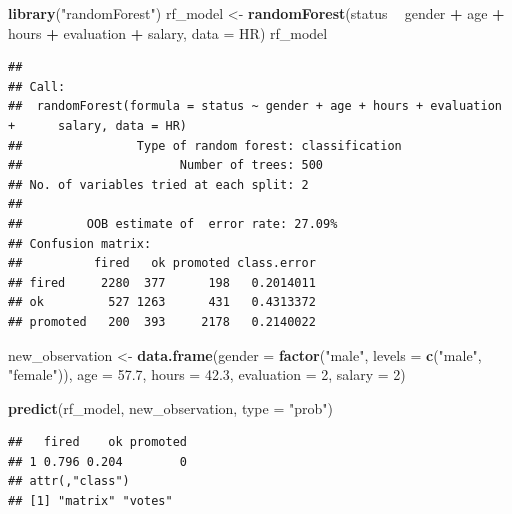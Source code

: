 \documentclass[]{krantz}
\newenvironment{Shaded}{\begin{snugshade}}{\end{snugshade}}
\newcommand{\DataTypeTok}[1]{\textcolor[rgb]{0.13,0.29,0.53}{#1}}
\newcommand{\DecValTok}[1]{\textcolor[rgb]{0.00,0.00,0.81}{#1}}
\newcommand{\FloatTok}[1]{\textcolor[rgb]{0.00,0.00,0.81}{#1}}
\newcommand{\KeywordTok}[1]{\textcolor[rgb]{0.13,0.29,0.53}{\textbf{#1}}}
\newcommand{\NormalTok}[1]{#1}
\newcommand{\OperatorTok}[1]{\textcolor[rgb]{0.81,0.36,0.00}{\textbf{#1}}}
\newcommand{\StringTok}[1]{\textcolor[rgb]{0.31,0.60,0.02}{#1}}
\theoremstyle{definition}
\theoremstyle{definition}
\theoremstyle{definition}
\theoremstyle{remark}
\begin{document}
\begin{Shaded}
\begin{Highlighting}[]
\KeywordTok{library}\NormalTok{(}\StringTok{"randomForest"}\NormalTok{)}
\NormalTok{rf_model <-}\StringTok{ }\KeywordTok{randomForest}\NormalTok{(status }\OperatorTok{~}\StringTok{ }\NormalTok{gender }\OperatorTok{+}\StringTok{ }\NormalTok{age }\OperatorTok{+}\StringTok{ }\NormalTok{hours }\OperatorTok{+}\StringTok{ }\NormalTok{evaluation }\OperatorTok{+}\StringTok{ }\NormalTok{salary, }\DataTypeTok{data =}\NormalTok{ HR)}
\NormalTok{rf_model}
\end{Highlighting}
\end{Shaded}

\begin{verbatim}
## 
## Call:
##  randomForest(formula = status ~ gender + age + hours + evaluation +      salary, data = HR) 
##                Type of random forest: classification
##                      Number of trees: 500
## No. of variables tried at each split: 2
## 
##         OOB estimate of  error rate: 27.09%
## Confusion matrix:
##          fired   ok promoted class.error
## fired     2280  377      198   0.2014011
## ok         527 1263      431   0.4313372
## promoted   200  393     2178   0.2140022
\end{verbatim}

\begin{Shaded}
\begin{Highlighting}[]
\NormalTok{new_observation <-}\StringTok{ }\KeywordTok{data.frame}\NormalTok{(}\DataTypeTok{gender =} \KeywordTok{factor}\NormalTok{(}\StringTok{"male"}\NormalTok{, }\DataTypeTok{levels =} \KeywordTok{c}\NormalTok{(}\StringTok{"male"}\NormalTok{, }\StringTok{"female"}\NormalTok{)),}
                      \DataTypeTok{age =} \FloatTok{57.7}\NormalTok{,}
                      \DataTypeTok{hours =} \FloatTok{42.3}\NormalTok{,}
                      \DataTypeTok{evaluation =} \DecValTok{2}\NormalTok{,}
                      \DataTypeTok{salary =} \DecValTok{2}\NormalTok{)}

\KeywordTok{predict}\NormalTok{(rf_model, new_observation, }\DataTypeTok{type =} \StringTok{"prob"}\NormalTok{)}
\end{Highlighting}
\end{Shaded}

\begin{verbatim}
##   fired    ok promoted
## 1 0.796 0.204        0
## attr(,"class")
## [1] "matrix" "votes"
\end{verbatim}
\end{document}
